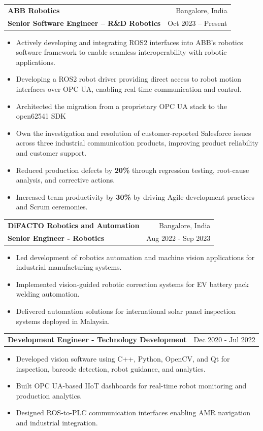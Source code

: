 \documentclass[a4paper,12pt]{article}
\newcommand{\cvspacing}{3pt}
\newcommand{\company}[2]{\textbf{#1} & #2 \\[\cvspacing]}
\newcommand{\designation}[2]{\textbf{#1} & #2 \\[\cvspacing]}
\newcommand{\designationpoints}[1]{
\begin{itemize}[
    leftmargin=*,
    itemsep=\cvspacing,
    topsep=0pt,
    parsep=0pt,
    partopsep=0pt,
]
#1
\end{itemize}
}
\begin{document}
\begin{tabularx}{\linewidth}{@{}X r@{}}
\company{ABB Robotics}{Bangalore, India}
\designation
{Senior Software Engineer -- R\&D Robotics}
{Oct 2023 -- Present}
\end{tabularx}
\designationpoints{
\item Actively developing and integrating ROS2 interfaces into ABB's robotics software framework to enable seamless interoperability with robotic applications.
\item Developing a ROS2 robot driver providing direct access to robot motion interfaces over OPC UA, enabling real-time communication and control.
\item Architected the migration from a proprietary OPC UA stack to the open62541 SDK
\item Own the investigation and resolution of customer-reported Salesforce issues across three industrial communication products, improving product reliability and customer support.
\item Reduced production defects by \textbf{20\%} through regression testing, root-cause analysis, and corrective actions.
\item Increased team productivity by \textbf{30\%} by driving Agile development practices and Scrum ceremonies.
}

\begin{tabularx}{\linewidth}{@{}X r@{}}
\company{DiFACTO Robotics and Automation}{Bangalore, India}
\designation
{Senior Engineer - Robotics}
{Aug 2022 - Sep 2023}
\end{tabularx}
\designationpoints{
\item Led development of robotics automation and machine vision applications for industrial manufacturing systems.
\item Implemented vision-guided robotic correction systems for EV battery pack welding automation.
\item Delivered automation solutions for international solar panel inspection systems deployed in Malaysia.
}

\begin{tabularx}{\linewidth}{@{}X r@{}}
\designation
{Development Engineer - Technology Development}
{Dec 2020 - Jul 2022}
\end{tabularx}
\designationpoints{
\item Developed vision software using C++, Python, OpenCV, and Qt for inspection, barcode detection, robot guidance, and analytics.
\item Built OPC UA-based IIoT dashboards for real-time robot monitoring and production analytics.
\item Designed ROS-to-PLC communication interfaces enabling AMR navigation and industrial integration.
}
\end{document}
